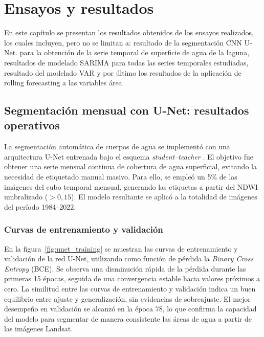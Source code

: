 
\chapter{Ensayos y resultados} %

\label{Chapter4} %
En este capítulo se presentan los resultados obtenidos de los ensayos realizados, los cuales incluyen, pero no se limitan a: resultado de la segmentación CNN U-Net. para la obtención de la serie temporal de superficie de agua de la laguna, resultados de modelado SARIMA para todas las series temporales estudiadas, resultado del modelado VAR y por último los resultados de la aplicación de rolling forecasting a las variables área. 


\section{Segmentación mensual con U-Net: resultados operativos}

La segmentación automática de cuerpos de agua se implementó con una arquitectura U-Net \citep{ronneberger2015unet} entrenada bajo el esquema \textit{student–teacher} \citep{hinton2015distilling}. El objetivo fue obtener una serie mensual continua de cobertura de agua superficial, evitando la necesidad de etiquetado manual masivo. Para ello, se empleó un 5\% de las imágenes del cubo temporal mensual, generando las etiquetas a partir del NDWI umbralizado ($>0,15$). El modelo resultante se aplicó a la totalidad de imágenes del período 1984–2022.

\subsection{Curvas de entrenamiento y validación}
En la figura~\ref{fig:unet_training} se muestran las curvas de entrenamiento y validación de la red U-Net, utilizando como función de pérdida la \textit{Binary Cross Entropy} (BCE). Se observa una disminución rápida de la pérdida durante las primeras 15 épocas, seguida de una convergencia estable hacia valores próximos a cero. La similitud entre las curvas de entrenamiento y validación indica un buen equilibrio entre ajuste y generalización, sin evidencias de sobreajuste. El mejor desempeño en validación se alcanzó en la época 78, lo que confirma la capacidad del modelo para segmentar de manera consistente las áreas de agua a partir de las imágenes Landsat.

